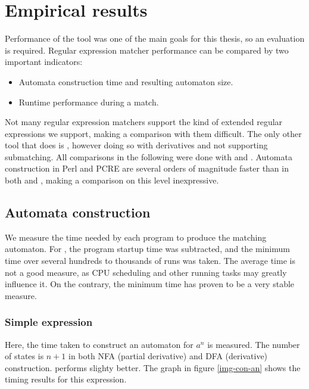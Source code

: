 \chapter{Empirical results}
\label{results}

Performance of the tool was one of the main goals for this thesis, so an
evaluation is required. Regular expression matcher performance can be compared
by two important indicators:

\begin{itemize}
   \item Automata construction time and resulting automaton size.
   \item Runtime performance during a match.
\end{itemize}

Not many regular expression matchers support the kind of extended regular
expressions we support, making a comparison with them difficult. The only other
tool that does is \mlulex{}, however doing so with derivatives and not
supporting submatching. All comparisons in the following were done with \dreml{}
and \mlulex{}. Automata construction in Perl and PCRE are several orders of
magnitude faster than in both \dreml{} and \mlulex{}, making a comparison on this
level inexpressive.


\section{Automata construction}

We measure the time needed by each program to produce the matching automaton.
For \mlulex{}, the program startup time was subtracted, and the minimum time
over several hundreds to thousands of runs was taken. The average time is not a
good measure, as CPU scheduling and other running tasks may greatly influence
it. On the contrary, the minimum time has proven to be a very stable measure.


\subsection{Simple expression}

Here, the time taken to construct an automaton for $a^n$ is measured. The number
of states is $n + 1$ in both NFA (partial derivative) and DFA (derivative)
construction. \mlulex{} performs slighty better. The graph in figure
\ref{img-con-an} shows the timing results for this expression.



